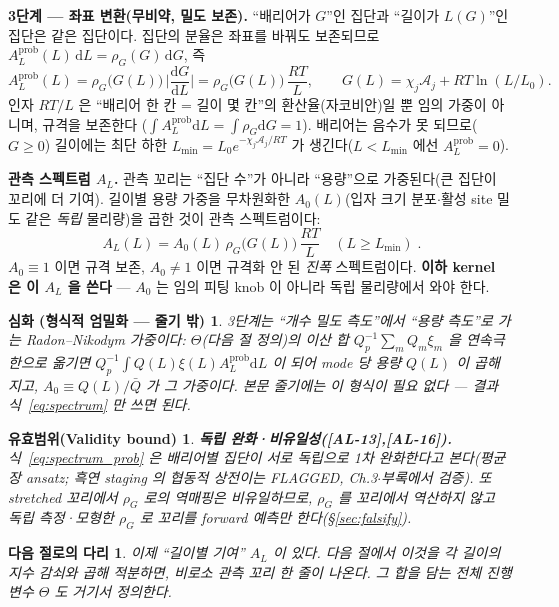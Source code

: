 \documentclass[11pt,a4paper]{article}
\newtheorem*{boundbox}{유효범위(Validity bound)}
\newtheorem*{rigorbox}{심화 (형식적 엄밀화 — 줄기 밖)}
\newtheorem*{bridgebox}{다음 절로의 다리}
\newcommand{\dd}{\mathrm{d}}
\newcommand{\AL}[1]{\textsf{[AL-#1]}}
\begin{document}
\textbf{3단계 — 좌표 변환(무비약, 밀도 보존).} ``배리어가 $G$''인 집단과 ``길이가 $L(G)$''인 집단은 같은
집단이다. 집단의 분율은 좌표를 바꿔도 보존되므로 $A_L^{\mathrm{prob}}(L)\,\dd L=\rho_G(G)\,\dd G$, 즉
\begin{equation}
A_L^{\mathrm{prob}}(L)=\rho_G\big(G(L)\big)\,\Big|\frac{\dd G}{\dd L}\Big|=\rho_G\big(G(L)\big)\,\frac{RT}{L},
\qquad G(L)=\chi_j\mathcal A_j+RT\ln(L/L_0).
\label{eq:spectrum_prob}
\end{equation}
인자 $RT/L$ 은 ``배리어 한 칸 = 길이 몇 칸''의 환산율(자코비안)일 뿐 임의 가중이 아니며, 규격을 보존한다
($\int A_L^{\mathrm{prob}}\dd L=\int\rho_G\dd G=1$). 배리어는 음수가 못 되므로($G\ge0$) 길이에는 최단 하한
$L_{\min}=L_0 e^{-\chi_j\mathcal A_j/RT}$ 가 생긴다($L<L_{\min}$ 에선 $A_L^{\mathrm{prob}}=0$).

\textbf{관측 스펙트럼 $A_L$.} 관측 꼬리는 ``집단 수''가 아니라 ``용량''으로 가중된다(큰 집단이 꼬리에 더
기여). 길이별 용량 가중을 무차원화한 $A_0(L)$(입자 크기 분포$\cdot$활성 site 밀도 같은 \emph{독립} 물리량)을
곱한 것이 관측 스펙트럼이다:
\begin{equation}
\boxed{\;A_L(L)=A_0(L)\,\rho_G\big(G(L)\big)\,\frac{RT}{L}\quad(L\ge L_{\min})\;.}
\label{eq:spectrum}
\end{equation}
$A_0\equiv1$ 이면 규격 보존, $A_0\ne1$ 이면 규격화 안 된 \emph{진폭} 스펙트럼이다. \textbf{이하 kernel 은 이
$A_L$ 을 쓴다} — $A_0$ 는 임의 피팅 knob 이 아니라 독립 물리량에서 와야 한다.

\begin{rigorbox}
3단계는 ``개수 밀도 측도''에서 ``용량 측도''로 가는 Radon--Nikodym 가중이다: $\Theta$(다음 절 정의)의 이산
합 $Q_p^{-1}\sum_m Q_m\xi_m$ 을 연속극한으로 옮기면 $Q_p^{-1}\!\int Q(L)\xi(L)A_L^{\mathrm{prob}}\dd L$ 이
되어 mode 당 용량 $Q(L)$ 이 곱해지고, $A_0\equiv Q(L)/\bar Q$ 가 그 가중이다. 본문 줄기에는 이 형식이
필요 없다 — 결과식~\eqref{eq:spectrum} 만 쓰면 된다.
\end{rigorbox}
\begin{boundbox}
\textbf{독립 완화·비유일성(\AL{13},\AL{16}).} 식~\eqref{eq:spectrum_prob} 은 배리어별 집단이 \emph{서로
독립}으로 1차 완화한다고 본다(평균장 ansatz; 흑연 staging 의 협동적 상전이는 FLAGGED, Ch.3$\cdot$부록에서
검증). 또 stretched 꼬리에서 $\rho_G$ 로의 역매핑은 비유일하므로, $\rho_G$ 를 꼬리에서 \emph{역산하지
않고} 독립 측정·모형한 $\rho_G$ 로 꼬리를 \emph{forward 예측}만 한다(\S\ref{sec:falsify}).
\end{boundbox}

\begin{bridgebox}
이제 ``길이별 기여'' $A_L$ 이 있다. 다음 절에서 이것을 각 길이의 지수 감쇠와 곱해 적분하면, 비로소
\emph{관측 꼬리} 한 줄이 나온다. 그 합을 담는 전체 진행 변수 $\Theta$ 도 거기서 정의한다.
\end{bridgebox}
\end{document}

